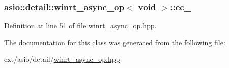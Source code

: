 \subsubsection[{ec\+\_\+}]{ {\bf asio\+::detail\+::winrt\+\_\+async\+\_\+op}$<$ void $>$\+::ec\+\_\+}\label{classasio_1_1detail_1_1winrt__async__op_3_01void_01_4_aad658595d15bf780e9c971f3f0db31a3}


Definition at line 51 of file winrt\+\_\+async\+\_\+op.\+hpp.



The documentation for this class was generated from the following file\+:\begin{DoxyCompactItemize}
\item 
ext/asio/detail/\hyperlink{winrt__async__op_8hpp}{winrt\+\_\+async\+\_\+op.\+hpp}\end{DoxyCompactItemize}
